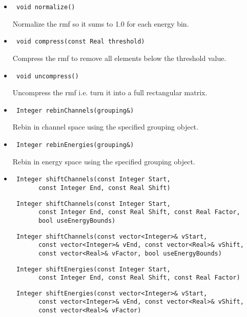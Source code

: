 \documentclass[11pt]{book}
\begin{document}
\begin{itemize}
\item  \begin{verbatim} void normalize() \end{verbatim}
  
          Normalize the rmf so it sums to 1.0 for each energy bin.

\item  \begin{verbatim} void compress(const Real threshold) \end{verbatim}

          Compress the rmf to remove all elements below the threshold value.

\item  \begin{verbatim} void uncompress() \end{verbatim}

          Uncompress the rmf i.e. turn it into a full rectangular matrix.

\item  \begin{verbatim} Integer rebinChannels(grouping&) \end{verbatim}

          Rebin in channel space using the specified grouping object.

\item  \begin{verbatim} Integer rebinEnergies(grouping&) \end{verbatim}

          Rebin in energy space using the specified grouping object.

\item  \begin{verbatim} Integer shiftChannels(const Integer Start,
       const Integer End, const Real Shift) \end{verbatim}
       \begin{verbatim} Integer shiftChannels(const Integer Start, 
       const Integer End, const Real Shift, const Real Factor, 
       bool useEnergyBounds) \end{verbatim}
       \begin{verbatim} Integer shiftChannels(const vector<Integer>& vStart,
       const vector<Integer>& vEnd, const vector<Real>& vShift, 
       const vector<Real>& vFactor, bool useEnergyBounds) \end{verbatim}
       \begin{verbatim} Integer shiftEnergies(const Integer Start, 
       const Integer End, const Real Shift, const Real Factor) \end{verbatim}
       \begin{verbatim} Integer shiftEnergies(const vector<Integer>& vStart,
       const vector<Integer>& vEnd, const vector<Real>& vShift, 
       const vector<Real>& vFactor) \end{verbatim}


\end{itemize}
\end{document}
